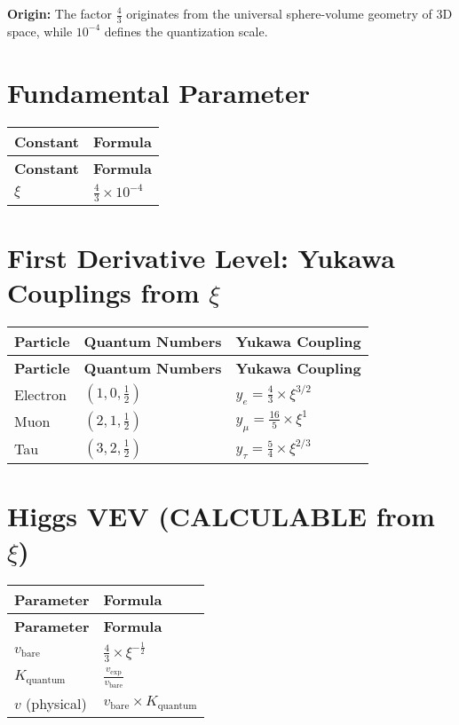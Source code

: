 \documentclass[12pt,a4paper]{article}
\begin{document}
	\textbf{Origin:} The factor $\frac{4}{3}$ originates from the universal sphere-volume geometry of 3D space, while $10^{-4}$ defines the quantization scale.
	
	\section{Fundamental Parameter}
	
	\begin{longtable}{|p{3cm}|p{4cm}|}
		\hline
		\textbf{Constant} & \textbf{Formula} \\
		\hline
		\endfirsthead
		\hline
		\textbf{Constant} & \textbf{Formula} \\
		\hline
		\endhead
		\(\xi\) & \(\frac{4}{3} \times 10^{-4}\) \\
		\hline
	\end{longtable}
	
	\section{First Derivative Level: Yukawa Couplings from \(\xi\)}
	
	\begin{longtable}{|p{2.5cm}|p{3cm}|p{4cm}|}
		\hline
		\textbf{Particle} & \textbf{Quantum Numbers} & \textbf{Yukawa Coupling} \\
		\hline
		\endfirsthead
		\hline
		\textbf{Particle} & \textbf{Quantum Numbers} & \textbf{Yukawa Coupling} \\
		\hline
		\endhead
		Electron & \((1,0,\frac{1}{2})\) & \(y_e = \frac{4}{3} \times \xi^{3/2}\) \\
		\hline
		Muon & \((2,1,\frac{1}{2})\) & \(y_{\mu} = \frac{16}{5} \times \xi^{1}\) \\
		\hline
		Tau & \((3,2,\frac{1}{2})\) & \(y_{\tau} = \frac{5}{4} \times \xi^{2/3}\) \\
		\hline
	\end{longtable}
	
	\section{Higgs VEV (CALCULABLE from \(\xi\))}
	
	\begin{longtable}{|p{3cm}|p{4cm}|}
		\hline
		\textbf{Parameter} & \textbf{Formula} \\
		\hline
		\endfirsthead
		\hline
		\textbf{Parameter} & \textbf{Formula} \\
		\hline
		\endhead
		\(v_{\text{bare}}\) & \(\frac{4}{3} \times \xi^{-\frac{1}{2}}\) \\
		\hline
		\(K_{\text{quantum}}\) & \(\frac{v_{\text{exp}}}{v_{\text{bare}}}\) \\
		\hline
		\(v\) (physical) & \(v_{\text{bare}} \times K_{\text{quantum}}\) \\
		\hline
	\end{longtable}
	
\end{document}
